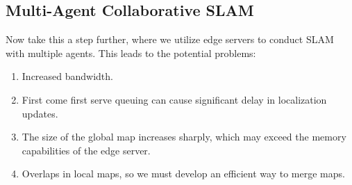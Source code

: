 \documentclass{article}
\begin{document}
  \subsection{Multi-Agent Collaborative SLAM}

  Now take this a step further, where we utilize edge servers to conduct SLAM with multiple agents. This leads to the potential problems: 
  \begin{enumerate}
      \item Increased bandwidth. 
      \item First come first serve queuing can cause significant delay in localization updates. 
      \item The size of the global map increases sharply, which may exceed the memory capabilities of the edge server. 
      \item Overlaps in local maps, so we must develop an efficient way to merge maps. 
  \end{enumerate}
\end{document}
